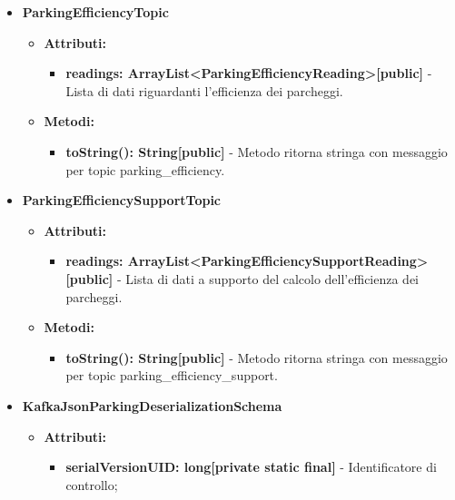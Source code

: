 \documentclass[8pt]{article}
\begin{document}
\begin{itemize}
\begin{itemize}
\begin{itemize}
        \end{itemize}
    \end{itemize}
    \item \textbf{ParkingEfficiencyTopic}
    \begin{itemize}
        \item \textbf{Attributi:}
        \begin{itemize}
            \item \textbf{readings: ArrayList<ParkingEfficiencyReading>[public]} - Lista di dati riguardanti l'efficienza dei parcheggi.
        \end{itemize}
    \end{itemize}
    \begin{itemize}
        \item \textbf{Metodi:}
        \begin{itemize}
            \item \textbf{toString(): String[public]} - Metodo ritorna stringa con messaggio per topic parking\_efficiency.
        \end{itemize}
    \end{itemize}
    \item \textbf{ParkingEfficiencySupportTopic}
    \begin{itemize}
        \item \textbf{Attributi:}
        \begin{itemize}
            \item \textbf{readings: ArrayList<ParkingEfficiencySupportReading>[public]} - Lista di dati a supporto del calcolo dell'efficienza dei parcheggi.
        \end{itemize}
    \end{itemize}
    \begin{itemize}
        \item \textbf{Metodi:}
        \begin{itemize}
            \item \textbf{toString(): String[public]} - Metodo ritorna stringa con messaggio per topic parking\_efficiency\_support.
        \end{itemize}
    \end{itemize}
    \item \textbf{KafkaJsonParkingDeserializationSchema}
    \begin{itemize}
        \item \textbf{Attributi:}
        \begin{itemize}
            \item \textbf{serialVersionUID: long[private static final]} - Identificatore di controllo;

\end{itemize}
\end{itemize}
\end{itemize}
\end{document}
